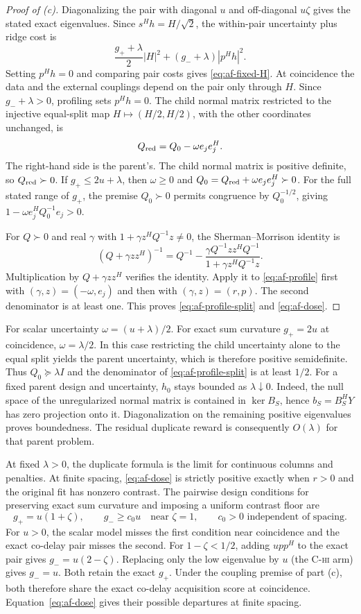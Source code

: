 \begin{proof}[Proof of \textup{(c)}]
Diagonalizing the pair with diagonal $u$ and off-diagonal $u\zeta$
gives the stated exact eigenvalues. Since $s^Hh=H/\sqrt2$, the
within-pair uncertainty plus ridge cost is
\[
 \frac{g_++\lambda}{2}|H|^2+(g_-+\lambda)|p^Hh|^2 .
\]
Setting $p^Hh=0$ and comparing pair costs gives
\eqref{eq:af-fixed-H}. At coincidence the data and the external
couplings depend on the pair only through $H$. Since $g_-+\lambda>0$,
profiling sets $p^Hh=0$. The child normal matrix restricted to the
injective equal-split map $H\mapsto(H/2,H/2)$, with the other
coordinates unchanged, is
\[
 Q_{\rm red}=Q_0-\omega e_je_j^H .
\]
The right-hand side is the parent's. The child normal matrix is
positive definite, so $Q_{\rm red}\succ0$. If $g_+\le2u+\lambda$,
then $\omega\ge0$ and $Q_0=Q_{\rm red}+\omega e_je_j^H\succ0$.
For the full stated range of $g_+$, the premise $Q_0\succ0$ permits
congruence by $Q_0^{-1/2}$, giving
$1-\omega e_j^HQ_0^{-1}e_j>0$.

For $Q\succ0$ and real $\gamma$ with $1+\gamma z^HQ^{-1}z\ne0$,
the Sherman--Morrison identity is
\[
 (Q+\gamma zz^H)^{-1}
 =Q^{-1}-\frac{\gamma Q^{-1}zz^HQ^{-1}}{1+\gamma z^HQ^{-1}z}.
\]
Multiplication by $Q+\gamma zz^H$ verifies the identity. Apply it to
\eqref{eq:af-profile} first with $(\gamma,z)=(-\omega,e_j)$ and then
with $(\gamma,z)=(r,p)$. The second denominator is at least one.
This proves \eqref{eq:af-profile-split} and \eqref{eq:af-dose}.
\end{proof}

For scalar uncertainty $\omega=(u+\lambda)/2$. For exact sum
curvature $g_+=2u$ at coincidence, $\omega=\lambda/2$. In this case
restricting the child uncertainty alone to the equal split yields
the parent uncertainty, which is therefore positive semidefinite.
Thus $Q_0\succeq\lambda I$ and the denominator of
\eqref{eq:af-profile-split} is at least $1/2$. For a fixed parent
design and uncertainty, $\hat h_0$ stays bounded as
$\lambda\downarrow0$. Indeed, the null space of the unregularized
normal matrix is contained in $\ker B_S$, hence $b_S=B_S^HY$ has
zero projection onto it. Diagonalization on the remaining positive
eigenvalues proves boundedness. The residual duplicate reward is
consequently $O(\lambda)$ for that parent problem.

At fixed $\lambda>0$, the duplicate formula is the limit for
continuous columns and penalties. At finite spacing,
\eqref{eq:af-dose} is strictly positive exactly when $r>0$ and the
original fit has nonzero contrast. The pairwise design conditions
for preserving exact sum curvature and imposing a uniform contrast
floor are
\[
 g_+=u(1+\zeta),\qquad g_-\ge c_0u
 \quad\text{near }\zeta=1,\qquad c_0>0
 \text{ independent of spacing}.
\]
For $u>0$, the scalar model misses the first condition near
coincidence and the exact co-delay pair misses the second. For
$1-\zeta<1/2$, adding $upp^H$ to the exact pair gives
$g_-=u(2-\zeta)$. Replacing only the low eigenvalue by $u$
(the \textsc{C-hi} arm) gives $g_-=u$. Both retain the exact $g_+$.
Under the coupling premise of part (c), both therefore share the
exact co-delay acquisition score at coincidence.
Equation~\eqref{eq:af-dose} gives their possible departures at
finite spacing.

